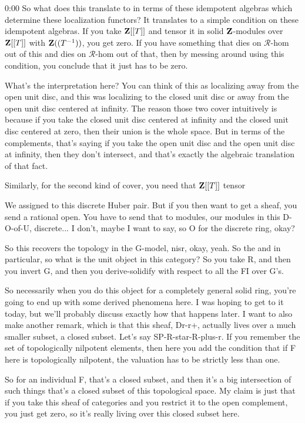 \begin{unfinished}{0:00}
So what does this translate to in terms of these idempotent algebras which determine these localization functors? It translates to a simple condition on these idempotent algebras. If you take $\mathbf Z[[T]]$ and tensor it in solid $\mathbf Z$-modules over $\mathbf Z[[T]]$ with $\mathbf Z((T^{-1}))$, you get zero. If you have something that dies on $\mathcal{R}$-hom out of this and dies on $\mathcal{R}$-hom out of that, then by messing around using this condition, you conclude that it just has to be zero.

What's the interpretation here? You can think of this as localizing away from the open unit disc, and this was localizing to the closed unit disc or away from the open unit disc centered at infinity. The reason those two cover intuitively is because if you take the closed unit disc centered at infinity and the closed unit disc centered at zero, then their union is the whole space. But in terms of the complements, that's saying if you take the open unit disc and the open unit disc at infinity, then they don't intersect, and that's exactly the algebraic translation of that fact.

Similarly, for the second kind of cover, you need that $\mathbf Z[[T]]$ tensor

We assigned to this discrete Huber pair. But if you then want to get a sheaf, you send a rational open. You have to send that to modules, our modules in this D-O-of-U, discrete... I don't, maybe I want to say, so O for the discrete ring, okay?

So this recovers the topology in the G-model, nisr, okay, yeah. So the and in particular, so what is the unit object in this category? So you take R, and then you invert G, and then you derive-solidify with respect to all the FI over G's.

So necessarily when you do this object for a completely general solid ring, you're going to end up with some derived phenomena here. I was hoping to get to it today, but we'll probably discuss exactly how that happens later. I want to also make another remark, which is that this sheaf, Dr-r+, actually lives over a much smaller subset, a closed subset. Let's say SP-R-star-R-plus-r. If you remember the set of topologically nilpotent elements, then here you add the condition that if F here is topologically nilpotent, the valuation has to be strictly less than one. 

So for an individual F, that's a closed subset, and then it's a big intersection of such things that's a closed subset of this topological space. My claim is just that if you take this sheaf of categories and you restrict it to the open complement, you just get zero, so it's really living over this closed subset here.


\end{unfinished}
